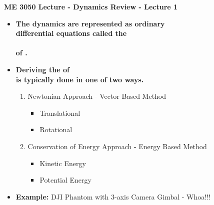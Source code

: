 \documentclass[11pt]{article}
\newcommand{\NUM}{1 }
\newcommand{\B}{\color{blue}}
\newcommand{\K}{\color{black}}
\begin{document}
\textbf{ \LARGE ME 3050 Lecture - Dynamics Review - Lecture \NUM  } \\

\begin{itemize}



	\item \textbf{ \Large The \B dynamics \K are represented as ordinary \vspace{3mm}\\
differential equations called the \\\\ \underline{\hspace{60mm}} of \underline{\hspace{60mm}}.} \vspace{2mm}\\

	\item \textbf{ \Large Deriving the 	\underline{\hspace{60mm}} of \underline{\hspace{60mm}} \vspace{1mm}\\is typically done in one of two ways.} \\
\Large
	\begin{enumerate}
		\item Newtonian Approach - Vector Based Method \vspace{3mm}\\
		\begin{itemize}
\item Translational\\
\item Rotational  \vspace{10mm}\\
\end{itemize} 
\item Conservation of Energy Approach - Energy Based Method \vspace{3mm}\\
		\begin{itemize}
\item Kinetic Energy\\
\item Potential Energy\\  
\end{itemize} 
	\end{enumerate}

\newpage

\item \textbf{ \Large  Example:} DJI Phantom with 3-axis Camera Gimbal - Whoa!!!\\


\end{itemize}
\end{document}
